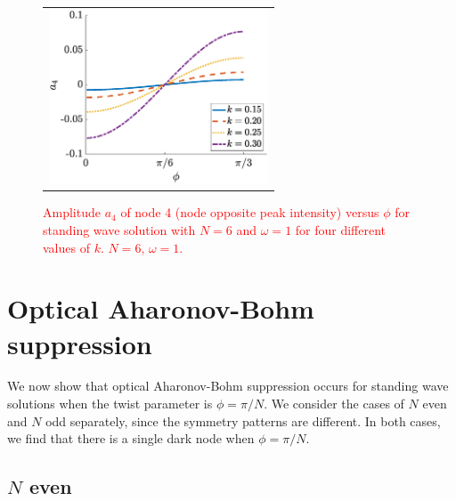 \documentclass[reprint, amsmath,amssymb,aps,pra]{revtex4-2}
\renewcommand{\revised}[1]{ \textcolor{red}{#1} }
\begin{document}
\begin{figure}
    \begin{center}
    \begin{tabular}{c}
    \includegraphics[width=6.5cm]{images/ABsuppression.eps}
    \end{tabular}
    \end{center}
    \caption{\revised{Amplitude $a_4$ of node 4 (node opposite peak intensity) versus $\phi$ for standing wave solution with $N=6$ and $\omega=1$ for four different values of $k$. $N=6$, $\omega=1$.}}
    \label{fig:ABsuppression}
\end{figure}


\section{Optical Aharonov-Bohm suppression}\label{sec:ABsupp}

We now show that optical Aharonov-Bohm suppression occurs for standing wave solutions when the twist parameter is $\phi = \pi/N$. We consider the cases of $N$ even and $N$ odd separately, since the symmetry patterns are different. In both cases, we find that there is a single dark node when $\phi = \pi/N$.

\subsection{\texorpdfstring{$N$}{N} even}\label{sec:Neven}
\end{document}
